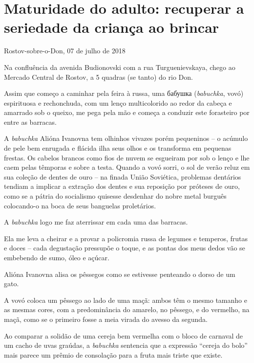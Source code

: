\chapter*{Maturidade do adulto: recuperar a seriedade da criança ao brincar}

\begin{flushright}
Rostov-sobre-o-Don, 07 de julho de 2018
\end{flushright}

Na confluência da avenida Budionovski com a rua Turguenievskaya, chego
ao Mercado Central de Rostov, a 5 quadras (se tanto) do rio Don.

Assim que começo a caminhar pela feira à russa, uma бабушка
(\emph{babuchka}, vovó) espirituosa e rechonchuda, com um lenço
multicolorido ao redor da cabeça e amarrado sob o queixo, me pega pela
mão e começa a conduzir este forasteiro por entre as barracas.

A \emph{babuchka} Alióna Ivanovna tem olhinhos vivazes porém pequeninos
-- o acúmulo de pele bem enrugada e flácida ilha seus olhos e os
transforma em pequenas frestas. Os cabelos brancos como fios de nuvem se
esgueiram por sob o lenço e lhe caem pelas têmporas e sobre a testa.
Quando a vovó sorri, o sol de verão reluz em sua coleção de dentes de
ouro -- na finada União Soviética, problemas dentários tendiam a
implicar a extração dos dentes e sua reposição por próteses de ouro,
como se a pátria do socialismo quisesse desdenhar do nobre metal burguês
colocando-o na boca de seus banguelas proletários.

A \emph{babuchka} logo me faz aterrissar em cada uma das barracas.

Ela me leva a cheirar e a provar a policromia russa de legumes e
temperos, frutas e doces -- cada degustação pressupõe o toque, e as
pontas dos meus dedos vão se embebendo de sumo, óleo e açúcar.

Alióna Ivanovna alisa os pêssegos como se estivesse penteando o dorso de
um gato.

A vovó coloca um pêssego ao lado de uma maçã: ambos têm o mesmo tamanho
e as mesmas cores, com a predominância do amarelo, no pêssego, e do
vermelho, na maçã, como se o primeiro fosse a meia virada do avesso da
segunda.

Ao comparar a solidão de uma cereja bem vermelha com o bloco de carnaval
de um cacho de uvas graúdas, a \emph{babuchka} sentencia que a expressão
``cereja do bolo'' mais parece um prêmio de consolação para a fruta mais
triste que existe.

